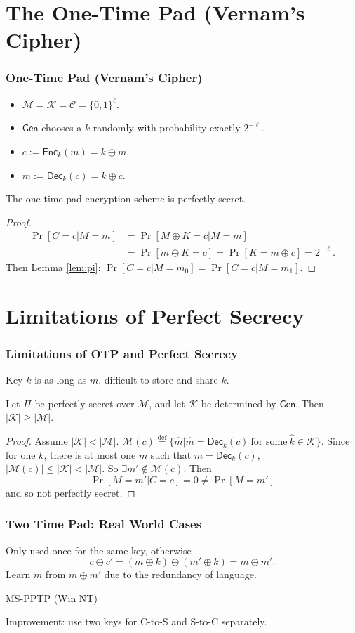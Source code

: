 \section{The One-Time Pad (Vernam's Cipher)}
\begin{frame}\frametitle{One-Time Pad (Vernam's Cipher)}
\begin{itemize}
	\item $\mathcal{M} = \mathcal{K} = \mathcal{C} = \{0,1\}^{\ell}$.
	\item $\mathsf{Gen}$ chooses a $k$ randomly with probability exactly $2^{-\ell}$.
	\item $c := \mathsf{Enc}_k(m) = k \oplus m$. 
	\item $m := \mathsf{Dec}_k(c) = k \oplus c$. 
\end{itemize}
\begin{theorem}
The one-time pad encryption scheme is perfectly-secret.
\end{theorem}
\begin{proof}
\[\begin{split} \Pr[C=c|M=m] &= \Pr[M \oplus K=c|M=m] \\
&= \Pr[m \oplus K=c] = \Pr[K = m \oplus c] = 2^{-\ell}.
\end{split}
\]
Then Lemma \ref{lem:pi}: $\Pr[C=c | M=m_0] = \Pr[C=c | M=m_1]$.
\end{proof}
\end{frame}
\section{Limitations of Perfect Secrecy}
\begin{frame}\frametitle{Limitations of OTP and Perfect Secrecy}
Key $k$ is as long as $m$, difficult to store and share $k$.
\begin{theorem}
Let $\Pi$ be perfectly-secret over $\mathcal{M}$, and let $\mathcal{K}$ be determined by $\mathsf{Gen}$. Then $|\mathcal{K}|\ge |\mathcal{M}|$. 
\end{theorem}
\begin{proof}
Assume $|\mathcal{K}| < |\mathcal{M}|$.
$\mathcal{M}(c) \overset{\text{def}}{=} \{ \hat{m} | \hat{m} = \mathsf{Dec}_k(c)\  \text{for some}\ \hat{k} \in \mathcal{K} \}$. Since for one $k$, there is at most one $m$ such that $m = \mathsf{Dec}_k(c)$, $|\mathcal{M}(c)|\le |\mathcal{K}| < |\mathcal{M}|$. So $\exists m' \notin \mathcal{M}(c)$. Then
\[ \Pr[M=m'|C=c] = 0 \neq \Pr[M = m'] \]
and so not perfectly secret.
\end{proof}
\end{frame}
\begin{frame}\frametitle{Two Time Pad: Real World Cases}
Only used once for the same key, otherwise
\[c\oplus c'=(m\oplus k)\oplus (m'\oplus k)=m\oplus m'.\]
Learn $m$ from $m\oplus m'$ due to the redundancy of language.
\begin{exampleblock}{MS-PPTP (Win NT)}
\begin{figure}
\begin{center}

\end{center}
\end{figure}
Improvement: use two keys for C-to-S and S-to-C separately.
\end{exampleblock}
\end{frame}
